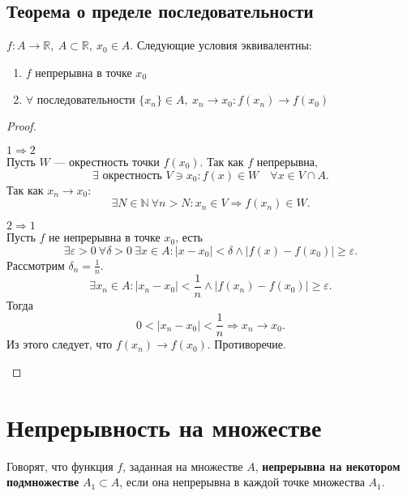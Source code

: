 \documentclass[11pt]{book}
\newcommand{\N}{\mathbb{N}}
\newcommand{\R}{\mathbb{R}}
\renewcommand{\ge}{\geqslant}
\theoremstyle{definition}
\theoremstyle{plain}
\theoremstyle{plain}
\theoremstyle{definition}
\theoremstyle{remark}
\begin{document}
\subsection{Теорема о пределе последовательности}
\begin{thm}
    $ f: A \to \R, ~ A\subset \R, ~ x_0 \in A$.
    Следующие условия эквивалентны:
    \begin{enumerate}
	\item $ f$ непрерывна в точке  $ x_0$
	\item $ \forall \text{ последовательности }\{x_{n}\} \in A, ~ x_{n} \to  x_0: f(x_{n}) \to  f(x_0)$
    \end{enumerate}
\end{thm}
\begin{proof}
    $ $
    \begin{description}
	\item $ \boxed{1 \Longrightarrow 2}$ \\
	    Пусть  $ W$ --- окрестность точки  $ f(x_0)$.  Так как $ f$ непрерывна,
	    \[
		\exists \text{ окрестность } V \ni  x_0: f(x) \in W \quad \forall x \in V \cap A
	    .\]
	    Так как $x_{n} \to  x_0$:
	    \[
		\exists N \in \N ~ \forall n > N: x_{n} \in V \Longrightarrow f(x_{n}) \in W
	    .\]
	\item $ \boxed{2 \Longrightarrow 1}$ \\
	    Пусть $ f$ не непрерывна в точке  $ x_0$, есть
	    \[
		\exists  \varepsilon >0 ~ \forall \delta >0~ \exists x \in A: |x - x_0| < \delta \wedge |f(x) - f(x_0)| \ge \varepsilon
	    .\]
	    Рассмотрим $ \delta_n = \frac{1}{n}$.
	    \[
		\exists x_{n} \in A: |x_{n}-x_0|<\frac{1}{n} \wedge |f(x_{n}) - f(x_0)  |\ge \varepsilon
	    .\]
	    Тогда  \[
		0 < |x_{n}-x_0| < \frac{1}{n} \Longrightarrow  x_{n} \to  x_0
	    .\]
	    Из этого следует, что $ f(x_{n}) \to  f(x_0)$. Противоречие.
    \end{description}
\end{proof}
\section{Непрерывность на множестве}
\begin{defn}
    Говорят, что функция $ f$, заданная на множестве $ A$,  {\bf непрерывна на некотором подмножестве} $ A_1 \subset A$, если она непрерывна в каждой точке множества $ A_1$.
\end{defn}
\end{document}
